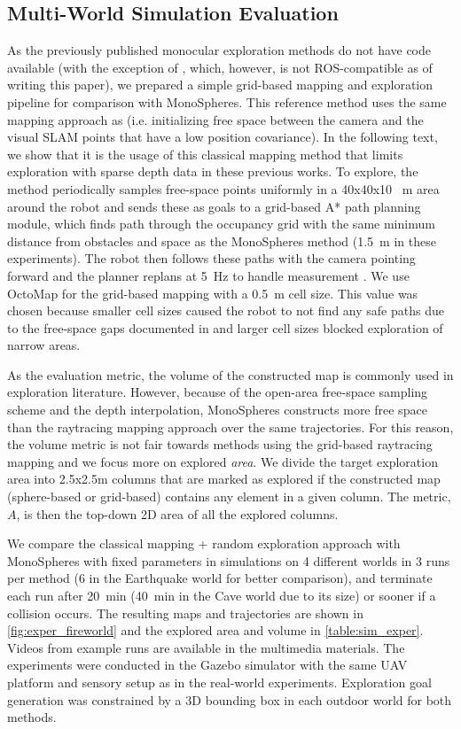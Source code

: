 \documentclass[letterpaper, 10 pt, journal, twoside]{IEEEtran}
\newcommand{\fix}[1]{\hypersetup{allcolors=black}{\color{black} {#1}}}
\begin{document}
{\subsection{Multi-World Simulation Evaluation}
\label{sec:sim_exper}
As the previously published monocular exploration methods do not have code available (with the exception of \cite{simon2023mononav}, which, however, is not ROS-compatible as of writing this paper), we prepared a simple grid-based mapping and exploration pipeline for comparison with MonoSpheres.
This reference method uses the same mapping approach as \cite{from_monoslam_to_explo, los_maps} (i.e. initializing free space between the camera and the visual SLAM points that have a low position covariance). 
{In the following text, we show that it is the usage of this classical mapping method that limits exploration with sparse depth data in these previous works.
To explore, the method periodically samples free-space points uniformly in a 40x40x10 \SI{}{\meter} area around the robot and sends these as goals to a grid-based A* path planning module, which finds path through the occupancy grid with the same minimum distance from obstacles and \fix{unknown} space as the MonoSpheres method (\SI{1.5}{\meter} in these experiments).
The robot then follows these paths with the camera pointing forward and the planner replans at \SI{5}{\hertz} to handle measurement \fix{inaccuracies}.}
We use OctoMap \cite{octomap} for the grid-based mapping with a \SI{0.5}{\meter} cell size.
This value was chosen because smaller cell sizes caused the robot to not find any safe paths due to the free-space gaps documented in \cite{from_monoslam_to_explo} and larger cell sizes blocked exploration of narrow areas. 

As the evaluation metric, the volume of the constructed map is commonly used in exploration literature.
However, because of the open-area free-space sampling scheme and the depth interpolation, MonoSpheres constructs more free space than the raytracing mapping approach over the same trajectories. 
{For this reason, the volume metric is not fair towards methods using the grid-based raytracing mapping and we focus more on explored \textit{area}.
We divide the target exploration area into 2.5x2.5m columns that are marked as explored if the constructed map (sphere-based or grid-based) contains any element in a given column.}
The metric, $A$, is then the top-down 2D area of all the explored columns.

{We compare the classical mapping + random exploration approach with MonoSpheres with fixed parameters in simulations on 4 different worlds in 3 runs per method (6 in the Earthquake world for better comparison), and terminate each run after \SI{20}{\minute} (\SI{40}{\minute} in the Cave world due to its size) or sooner if a collision occurs.
The resulting maps and trajectories are shown in \autoref{fig:exper_fireworld} and the explored area and volume in \autoref{table:sim_exper}.}
Videos from example runs are available in the multimedia materials.
The experiments were conducted in the Gazebo simulator \cite{gazebo} with the same UAV platform and sensory setup as in the real-world experiments.
{Exploration goal generation was constrained by a 3D bounding box in each outdoor world for both methods.}

}
\end{document}
